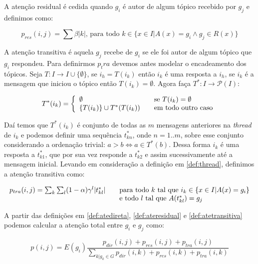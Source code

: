 \documentclass{article}
\begin{document}
A atenção residual é cedida quando $g_i$ é autor de algum tópico recebido por
$g_j$ e definimos como:

\begin{equation}
\label{def:ateresidual}
p_{res}(i,j) = \sum \beta |k|\text{, para todo $k \in \{x \in I| A(x)=g_i
\wedge g_j \in R(x)\}$}
\end{equation}

A atenção transitiva é aquela $g_j$ recebe de $g_i$ se ele foi autor de algum
tópico que $g_i$ respondeu. Para definirmos $p_tra$ devemos antes modelar o
encadeamento dos tópicos. Seja $T:I\to I\cup\{\emptyset\}$, se $i_h=T(i_k)$
então $i_k$ é uma resposta a $i_h$, se $i_k$ é a mensagem que iniciou o tópico
então $T(i_k)=\emptyset$. Agora faça $T^*:I\to\mathcal{P}(I)$:

\begin{equation}
\label{def:thread}
T^*(i_k) = \left\{ \begin{array}{l l} \emptyset &\quad\text{se
$T(i_k)=\emptyset$}\\ \{T(i_k)\} \cup T^*(T(i_k)) &\quad\text{em todo outro
caso}\end{array} \right.
\end{equation}

Daí temos que $T^*(i_k)$ é conjunto de todas as $m$ mensagens anteriores na
\textit{thread} de $i_k$ e podemos definir uma sequência $t^*_{kn}$, onde
$n=1..m$, sobre esse conjunto considerando a ordenação trivial: $a > b \iff a\in
T^*(b)$. Dessa forma $i_k$ é uma resposta a $t^*_{k1}$, que por sua vez responde
a $t^*_{k2}$ e assim sucessivamente até a mensagem inicial. Levando em
consideração a definição em \ref{def:thread}, definimos a atenção transitiva
como:

\begin{equation}
\label{def:atetransitiva}
\begin{array}{ l l }
p_{tra}(i,j) = \sum_k\sum_l
(1-\alpha)\gamma^l|t^*_{kl}| &\quad\text{para todo $k$ tal que $i_k \in \{x
\in I| A(x)=g_i\}$}\\&\quad\text{e todo $l$ tal que $A(t^*_{kl}) = g_j$}
\end{array}
\end{equation}

A partir das definições em \ref{def:atedireta}, \ref{def:ateresidual} e
\ref{def:atetransitiva} podemos calcular a atenção total entre $g_i$ e $g_j$
como:

\begin{equation}
\label{def:atetotal}
p(i,j) = E(g_i)\frac{p_{dir}(i,j) + p_{res}(i,j) + p_{tra}(i,j)}{\sum_{k|g_k \in
G}p_{dir}(i,k) + p_{res}(i,k) + p_{tra}(i,k)}
\end{equation}
\end{document}

